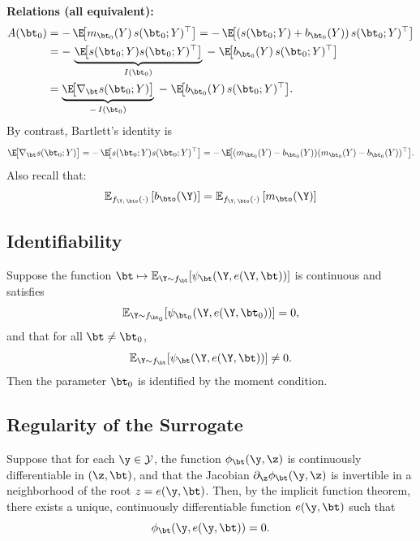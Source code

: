 \textbf{Relations (all equivalent):}
\begin{align*}
A(\bt_0)
&= -\,\E\!\big[m_{\bt_0}(Y)\,s(\bt_0;Y)^\top\big]
= -\,\E\!\big[(s(\bt_0;Y)+b_{\bt_0}(Y))\,s(\bt_0;Y)^\top\big]\\
&= -\,\underbrace{\E\!\big[s(\bt_0;Y)s(\bt_0;Y)^\top\big]}_{I(\bt_0)}
\;-\;\E\!\big[b_{\bt_0}(Y)\,s(\bt_0;Y)^\top\big]\\
&= \underbrace{\E\!\big[\nabla_\bt s(\bt_0;Y)\big]}_{-\,I(\bt_0)}
\;-\;\E\!\big[b_{\bt_0}(Y)\,s(\bt_0;Y)^\top\big].
\end{align*}
By contrast, Bartlett’s identity is
\[
\E\!\big[\nabla_\bt s(\bt_0;Y)\big]
= -\,\E\!\big[s(\bt_0;Y)s(\bt_0;Y)^\top\big]
= -\,\E\!\big[(m_{\bt_0}(Y)-b_{\bt_0}(Y))(m_{\bt_0}(Y)-b_{\bt_0}(Y))^\top\big].
\]
Also recall that:
%
\begin{equation}
    \mathbb{E}_{f_{\Y;\,\bto}(\cdot)}\left[b_\bto(\Y)\right] = \mathbb{E}_{f_{\Y;\,\bto}(\cdot)}\left[m_\bto(\Y)\right]
\end{equation}










\subsection{Identifiability}

\begin{theorem}[Identifiability]
Suppose the function $\bt \mapsto \mathbb{E}_{\Y \sim f_\bt}[\psi_\bt(\Y, e(\Y, \bt))]$ is continuous and satisfies
\[
\mathbb{E}_{\Y \sim f_{\bt_0}}[\psi_{\bt_0}(\Y, e(\Y, \bt_0))] = 0,
\]
and that for all $\bt \neq \bt_0$,
\[
\mathbb{E}_{\Y \sim f_{\bt}}[\psi_\bt(\Y, e(\Y, \bt))] \neq 0.
\]
Then the parameter $\bt_0$ is identified by the moment condition.
\end{theorem}

\subsection{Regularity of the Surrogate}

\begin{lemma}
Suppose that for each $\y \in \mathcal{Y}$, the function $\phi_\bt(\y, \z)$ is continuously differentiable in $(\z, \bt)$, and that the Jacobian $\partial_\z \phi_\bt(\y, \z)$ is invertible in a neighborhood of the root $z = e(\y, \bt)$. Then, by the implicit function theorem, there exists a unique, continuously differentiable function $e(\y, \bt)$ such that
\[
\phi_\bt(\y, e(\y, \bt)) = 0.
\]
\end{lemma}


